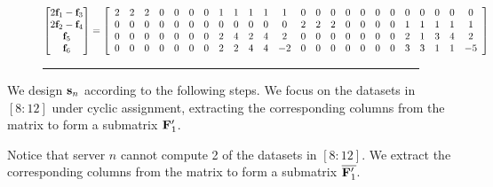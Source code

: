 \documentclass[conference,letterpaper]{IEEEtran}
\begin{document}
\begin{example}
\begin{figure}
\begin{equation} \label{eq:scheme 3 transmission of first class}
\begin{aligned}
\begin{bmatrix}
 2{{\bf f}}_1 - {{\bf f}}_3 \\ 
 2{{\bf f}}_2 - {{\bf f}}_4 \\ 
 {{\bf f}}_5 \\ 
 {{\bf f}}_6 
\end{bmatrix} = 
 \left[
\begin{array}{cccccccccccccccccccccccc}
 2 & 2 & 2 & 0 & 0 & 0 & 0 & 1 & 1 & 1 & 1 & 1 & 0 & 0 & 0 & 0 & 0 & 0 & 0 & 0 & 0 & 0 & 0 & 0 \\
 0 & 0 & 0 & 0 & 0 & 0 & 0 & 0 & 0 & 0 & 0 & 0 & 2 & 2 & 2 & 0 & 0 & 0 & 0 & 1 & 1 & 1 & 1 & 1 \\
 0 & 0 & 0 & 0 & 0 & 0 & 0 & 2 & 4 & 2 & 4 & 2 & 0 & 0 & 0 & 0 & 0 & 0 & 0 & 2 & 1 & 3 & 4 & 2 \\
 0 & 0 & 0 & 0 & 0 & 0 & 0 & 2 & 2 & 4 & 4 & -2 & 0 & 0 & 0 & 0 & 0 & 0 & 0 & 3 & 3 & 1 & 1 & -5
\end{array}
 \right]
\end{aligned}
\end{equation}
\rule{\textwidth}{0.2pt} %
\end{figure}
\fi


We design ${\bf s}_n$ according to the following steps. We focus on the datasets in $[8:12]$ under cyclic assignment, extracting the corresponding columns from the matrix to form a submatrix ${\bf F}^{\prime}_1$. 

Notice that server $n$ cannot compute 2 of the datasets in $[8:12]$. We extract the corresponding columns from the matrix to form a submatrix $\overline{{\bf F}^{\prime}_1}$.


\end{example}
\end{document}
